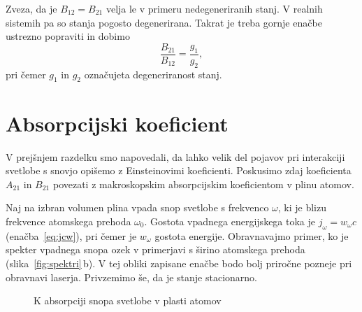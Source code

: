 \begin{remark}
 Zveza, da je $B_{12}=B_{21}$ velja le v primeru nedegeneriranih stanj. V realnih sistemih
 pa so stanja pogosto degenerirana. Takrat je treba gornje enačbe ustrezno popraviti in dobimo
\begin{equation}
\frac{B_{21}}{B_{12}} = \frac{g_1}{g_2},
\label{eq:ABdeg}
\end{equation}
pri čemer $g_{1}$ in $g_2$ označujeta degeneriranost stanj. 
\end{remark}

\section{Absorpcijski koeficient}
V prejšnjem razdelku smo napovedali, da lahko velik del pojavov pri interakciji 
svetlobe s snovjo opišemo z Einsteinovimi koeficienti. Poskusimo zdaj 
koeficienta $A_{21}$ in $B_{21}$ povezati z makroskopskim absorpcijskim
koeficientom v plinu atomov. 

Naj na izbran volumen plina vpada snop svetlobe s frekvenco
$\omega$, ki je blizu frekvence atomskega prehoda $\omega_{0}$. Gostota
vpadnega energijskega toka je $j_{\omega}=w_{\omega}c$ (enačba~\ref{eq:jcw}), 
pri čemer je $w_{\omega}$ gostota energije. Obravnavajmo primer, ko je 
spekter vpadnega snopa ozek v primerjavi s širino atomskega prehoda
(slika~\ref{fig:spektri}\,b). V tej obliki zapisane enačbe bodo bolj 
priročne pozneje pri obravnavi laserja. Privzemimo še, da
je stanje stacionarno. 
\begin{figure}[h]
\centering
\def\svgwidth{50truemm} 

\caption{K absorpciji snopa svetlobe v plasti atomov}
\label{fig:abs}
\end{figure}
 
